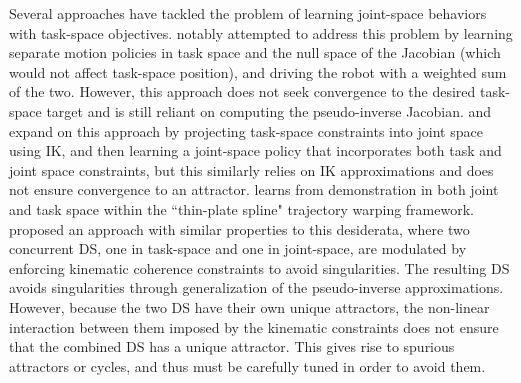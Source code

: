 \documentclass[letterpaper, 10 pt, conference,fleqn]{ieeeconf}
\begin{document}
Several approaches have tackled the problem of learning joint-space behaviors with task-space objectives. \cite{calinon2008probabilistic} notably attempted to address this problem by learning separate motion policies in task space and the null space of the Jacobian (which would not affect task-space position), and driving the robot with a weighted sum of the two.  However, this approach does not seek convergence to the desired task-space target and is still reliant on computing the pseudo-inverse Jacobian. \cite{calinon2010learning} and \cite{silverio2017learning} expand on this approach by projecting task-space constraints into joint space using IK, and then learning a joint-space policy that incorporates both task and joint space constraints, but this similarly relies on IK approximations and does not ensure convergence to an attractor.
\cite{lee2014unifying} learns from demonstration in both joint and task space within the ``thin-plate spline" trajectory warping framework. %
\cite{hersch2008reaching} proposed an approach with similar properties to this desiderata, where two concurrent DS, one in task-space and one in joint-space, are modulated by enforcing kinematic coherence constraints to avoid singularities. The resulting DS avoids singularities through generalization of the pseudo-inverse approximations. However, because the two DS have their own unique attractors, the non-linear interaction between them imposed by the kinematic constraints does not ensure that the combined DS has a unique attractor. This gives rise to spurious attractors or cycles, and thus must be carefully tuned in order to avoid them. 
\end{document}
